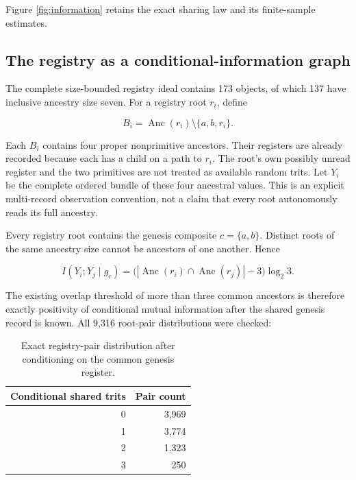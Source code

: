 \documentclass[11pt,a4paper]{article}
\begin{document}
Figure \ref{fig:information} retains the exact sharing law and its finite-sample estimates.

\subsection{The registry as a conditional-information graph}\label{the-registry-as-a-conditional-information-graph}

The complete size-bounded registry ideal contains 173 objects, of which 137 have inclusive ancestry size seven. For a registry root \(r_i\), define

\begin{equation}\label{eq:18}
B_i=\operatorname{Anc}(r_i)\setminus\{a,b,r_i\}.
\end{equation}

Each \(B_i\) contains four proper nonprimitive ancestors. Their registers are already recorded because each has a child on a path to \(r_i\). The root's own possibly unread register and the two primitives are not treated as available random trits. Let \(Y_i\) be the complete ordered bundle of these four ancestral values. This is an explicit multi-record observation convention, not a claim that every root autonomously reads its full ancestry.

Every registry root contains the genesis composite \(c=\{a,b\}\). Distinct roots of the same ancestry size cannot be ancestors of one another. Hence

\begin{equation}\label{eq:19}
\boxed{
I(Y_i;Y_j\mid g_c)
=\bigl(|\operatorname{Anc}(r_i)\cap\operatorname{Anc}(r_j)|-3\bigr)\log_2 3.
}
\end{equation}

The existing overlap threshold of more than three common ancestors is therefore exactly positivity of conditional mutual information after the shared genesis record is known. All 9,316 root-pair distributions were checked:

\begin{table}[htbp]\centering
\caption{Exact registry-pair distribution after conditioning on the common genesis register.}\label{tab:registry_pairs}
\small\setlength{\tabcolsep}{5pt}\renewcommand{\arraystretch}{1.15}
\begin{tabular}{@{}rr@{}}

\toprule\noalign{}
Conditional shared trits & Pair count \\
\midrule\noalign{}

0 & 3,969 \\
1 & 3,774 \\
2 & 1,323 \\
3 & 250 \\
\bottomrule
\end{tabular}
\end{table}
\end{document}
